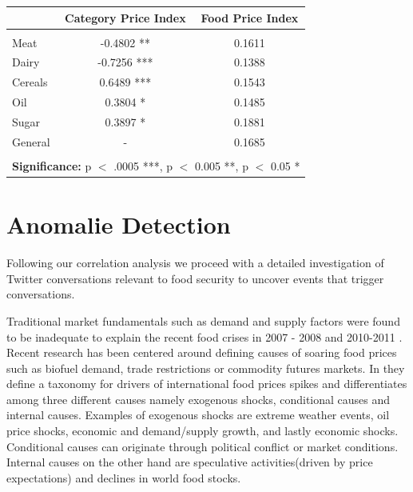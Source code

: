  

 
 \begin{center}
 \begin{tabular}{ l | c  | c  }
			
   & \textbf{Category Price Index}  & \textbf{Food Price Index} \\
  \hline
  \\
  Meat & -0.4802 **    & 0.1611  \\
  
  Dairy & -0.7256 ***  & 0.1388\\

  Cereals & 0.6489 *** & 0.1543 \\

  Oil & 0.3804 * &  0.1485  \\

  Sugar & 0.3897 * &0.1881 \\

  General & - & 0.1685 \\
\hline 

\multicolumn{3}{c}{\null}\\

\multicolumn{3}{c}{\textbf{Significance:} p $<$ .0005 ***, p $<$ 0.005 **, p $<$ 0.05 *}\\
\hline  
\end{tabular}
\end{center}


 \section{Anomalie Detection}


Following our correlation analysis we proceed with a detailed investigation of Twitter conversations relevant to food security to uncover events that trigger conversations.  


Traditional market fundamentals such as demand and supply factors were found to be inadequate to explain the recent food crises in 2007 - 2008 and 2010-2011 \cite{abbott2009}. Recent research has been centered around defining causes of soaring food prices such as biofuel demand, trade restrictions or commodity futures markets. In \cite{Tadesse2014} they define a taxonomy for drivers of  international food prices spikes and differentiates among three different causes namely exogenous shocks, conditional causes and internal causes. Examples of exogenous shocks are extreme weather events, oil price shocks, economic and demand/supply growth, and lastly economic shocks. Conditional causes can originate through political conflict or market conditions. Internal causes on the other hand are speculative activities(driven by price expectations) and declines in world food stocks. 

